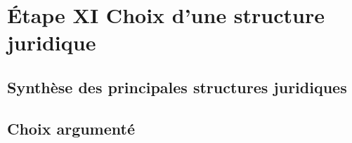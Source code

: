 \section{Étape XI \textendash{} Choix d'une structure juridique}

\subsection{Synthèse des principales structures juridiques}
\subsection{Choix argumenté}
